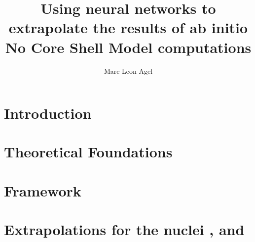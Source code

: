






\title{Using neural networks to extrapolate the results of
  ab initio No Core Shell Model computations}
\author{Marc Leon Agel}


\submissiondate{\today}
\examdate{\today}

\maketitle

\affidavit


\tableofcontents

\chapter{Introduction}
\label{chap:introduction}


\chapter{Theoretical Foundations}
\label{chap:foundations}



\chapter{Framework}
\label{chap:framework}


\chapter{Extrapolations for the nuclei ,  and }
\label{chap:reproduction}


